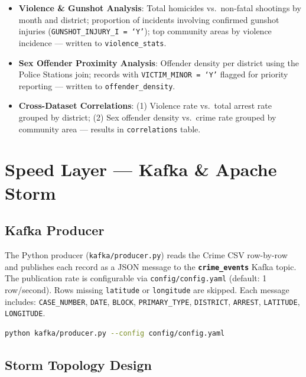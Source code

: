 \documentclass[12pt,a4paper]{article}
\begin{document}
\begin{itemize}[leftmargin=1.6em]
  \item \textbf{Violence \& Gunshot Analysis}: Total homicides vs.\ non-fatal shootings by month and district; proportion of incidents involving confirmed gunshot injuries (\texttt{GUNSHOT\_INJURY\_I = `Y'}); top community areas by violence incidence — written to \texttt{violence\_stats}.
  \item \textbf{Sex Offender Proximity Analysis}: Offender density per district using the Police Stations join; records with \texttt{VICTIM\_MINOR = `Y'} flagged for priority reporting — written to \texttt{offender\_density}.
  \item \textbf{Cross-Dataset Correlations}: (1) Violence rate vs.\ total arrest rate grouped by district; (2) Sex offender density vs.\ crime rate grouped by community area — results in \texttt{correlations} table.
\end{itemize}

\section{Speed Layer — Kafka \& Apache Storm}

\subsection{Kafka Producer}

The Python producer (\texttt{kafka/producer.py}) reads the Crime CSV row-by-row and publishes each record as a JSON message to the \textbf{\texttt{crime\_events}} Kafka topic. The publication rate is configurable via \texttt{config/config.yaml} (default: 1 row/second). Rows missing \texttt{latitude} or \texttt{longitude} are skipped. Each message includes: \texttt{CASE\_NUMBER}, \texttt{DATE}, \texttt{BLOCK}, \texttt{PRIMARY\_TYPE}, \texttt{DISTRICT}, \texttt{ARREST}, \texttt{LATITUDE}, \texttt{LONGITUDE}.

\begin{lstlisting}[language=bash, caption={Starting the Kafka Producer}]
python kafka/producer.py --config config/config.yaml
\end{lstlisting}

\subsection{Storm Topology Design}
\end{document}
